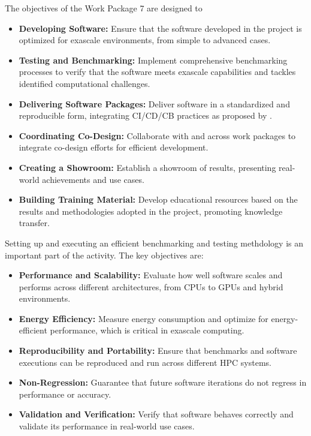 The objectives of the Work Package 7 are designed to 
\begin{itemize}
    \item \textbf{Developing Software:} Ensure that the software developed in the \exama project is optimized for exascale environments, from simple to advanced cases.
    \item \textbf{Testing and Benchmarking:} Implement comprehensive benchmarking processes to verify that the software meets exascale capabilities and tackles identified computational challenges.
    \item \textbf{Delivering Software Packages:} Deliver software in a standardized and reproducible form, integrating CI/CD/CB practices as proposed by \exadi.
    \item \textbf{Coordinating Co-Design:} Collaborate with \exadi and across \exama work packages to integrate co-design efforts for efficient development.
    \item \textbf{Creating a Showroom:} Establish a showroom of \exama results, presenting real-world achievements and use cases.
    \item \textbf{Building Training Material:} Develop educational resources based on the results and methodologies adopted in the \exama project, promoting knowledge transfer.
\end{itemize}
Setting up and executing an efficient benchmarking and testing methdology is an important part of the activity. 
The key objectives are:
\begin{itemize}
    \item \textbf{Performance and Scalability:} Evaluate how well software scales and performs across different architectures, from CPUs to GPUs and hybrid environments.
    \item \textbf{Energy Efficiency:} Measure energy consumption and optimize for energy-efficient performance, which is critical in exascale computing.
    \item \textbf{Reproducibility and Portability:} Ensure that benchmarks and software executions can be reproduced and run across different HPC systems.
    \item \textbf{Non-Regression:} Guarantee that future software iterations do not regress in performance or accuracy.
    \item \textbf{Validation and Verification:} Verify that software behaves correctly and validate its performance in real-world use cases.
\end{itemize}

